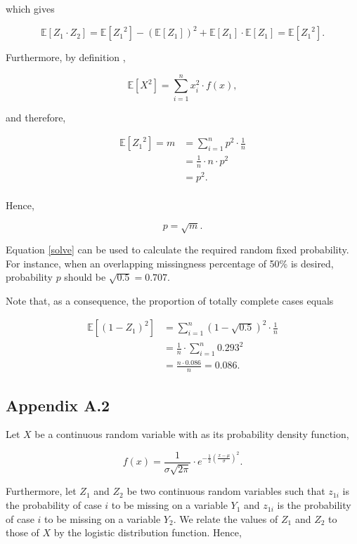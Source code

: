 \documentclass[]{interact}
\begin{document}
\noindent which gives

\begin{equation}\label{similar}
\mathbb{E}[Z_1 \cdot Z_2] = \mathbb{E}[{Z_1}^2] - {(\mathbb{E}[Z_1])}^2 + \mathbb{E}[Z_1] \cdot \mathbb{E}[Z_1] =  \mathbb{E}[{Z_1}^2]. 
\end{equation}

\noindent Furthermore, by definition \citep{Freund}, 

\[
\mathbb{E}[X^2] = \sum_{i = 1}^n x_i^2 \cdot f(x),  
\]

\noindent and therefore, 

\begin{align*}
\mathbb{E}[{Z_1}^2] = m &= \sum_{i = 1}^n p^2 \cdot \frac{1}{n}\\
&= \frac{1}{n} \cdot n \cdot p^2\\
&= p^2.\\
\end{align*}

\noindent Hence,

\begin{equation}\label{solve}
p = \sqrt{m}.
\end{equation}

\noindent Equation \eqref{solve} can be used to calculate the required random fixed probability. For instance, when an overlapping missingness percentage of 50\% is desired, probability $p$ should be $\sqrt{0.5} = 0.707$. 

\noindent Note that, as a consequence, the proportion of totally complete cases equals

\begin{align*}
\mathbb{E}[(1-Z_1)^2] &= \sum_{i = 1}^n {(1-\sqrt{0.5})}^2 \cdot \frac{1}{n} \\
&= \frac{1}{n} \cdot \sum_{i = 1}^n 0.293^2 \\
&= \frac{n \cdot 0.086}{n} = 0.086.
\end{align*}

\subsection*{Appendix A.2}

Let $X$ be a continuous random variable with as its probability density function, 

\[
f(x) = \frac{1}{\sigma\sqrt{2\pi}}\cdot e^{-\frac{1}{2}(\frac{x - \mu}{\sigma})^2}.
\]

\noindent Furthermore, let $Z_1$ and $Z_2$ be two continuous random variables such that $z_{1i}$ is the probability of case $i$ to be missing on a variable $Y_1$ and $z_{1i}$ is the probability of case $i$ to be missing on a variable $Y_2$. We relate the values of $Z_1$ and $Z_2$ to those of $X$ by the logistic distribution function. Hence, 
\end{document}
